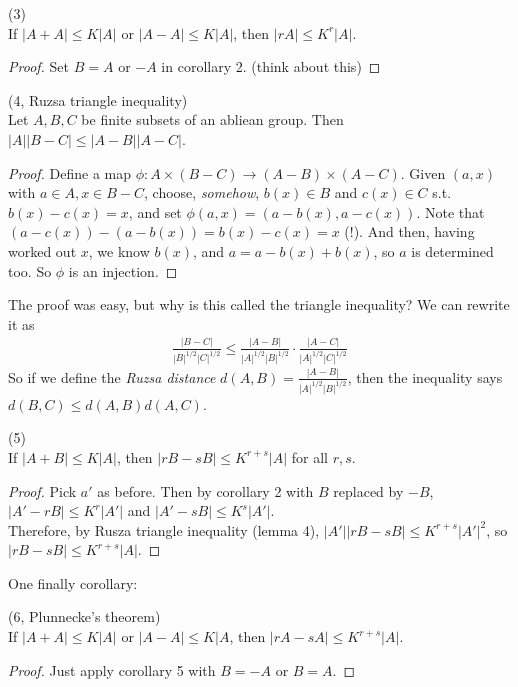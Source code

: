 \documentclass[a4paper]{article}
\begin{document}
\begin{coro} (3)\\
    If $|A+A| \leq K|A|$ or $|A-A| \leq K|A|$, then $|rA| \leq K^r|A|$.
    \begin{proof}
        Set $B=A$ or $-A$ in corollary 2. (think about this)
    \end{proof}
\end{coro}

\begin{lemma} (4, Ruzsa triangle inequality)\\
    Let $A,B,C$ be finite subsets of an abliean group. Then $|A||B-C| \leq |A-B||A-C|$.
    \begin{proof}
        Define a map $\phi: A\times(B-C) \to (A-B) \times (A-C)$. Given $(a,x)$ with $a\in A, x \in B-C$, choose, \emph{somehow}, $b(x) \in B$ and $c(x) \in C$ s.t. $b(x) - c(x) = x$, and set $\phi(a,x) = (a-b(x),a-c(x))$. Note that $(a-c(x)) - (a-b(x)) = b(x)-c(x) = x$ (!). And then, having worked out $x$, we know $b(x)$, and $a=a-b(x)+b(x)$, so $a$ is determined too. So $\phi$ is an injection.
    \end{proof}
\end{lemma}

The proof was easy, but why is this called the triangle inequality? We can rewrite it as 
\begin{equation*}
    \begin{aligned}
        \frac{|B-C|}{|B|^{1/2}|C|^{1/2}} \leq \frac{|A-B|}{|A|^{1/2}|B|^{1/2}} \cdot \frac{|A-C|}{|A|^{1/2}|C|^{1/2}}
    \end{aligned}
\end{equation*}
So if we define the \emph{Ruzsa distance} $d(A,B) = \frac{|A-B|}{|A|^{1/2}|B|^{1/2}}$, then the inequality says $d(B,C) \leq d(A,B) d(A,C)$.

\begin{coro} (5)\\
    If $|A+B| \leq K|A|$, then $|rB-sB| \leq K^{r+s}|A|$ for all $r,s$.
    \begin{proof}
        Pick $a'$ as before. Then by corollary 2 with $B$ replaced by $-B$, $|A'-rB| \leq K^r|A'|$ and $|A'-sB| \leq K^s|A'|$.\\
        Therefore, by Rusza triangle inequality (lemma 4), $|A'||rB-sB| \leq K^{r+s}|A'|^2$, so $|rB-sB| \leq K^{r+s} |A|$.
    \end{proof}
\end{coro}

One finally corollary:
\begin{coro} (6, Plunnecke's theorem)\\
    If $|A+A| \leq K|A|$ or $|A-A| \leq K|A$, then $|rA-sA| \leq K^{r+s} |A|$.
    \begin{proof}
        Just apply corollary 5 with $B=-A$ or $B=A$.
    \end{proof}
\end{coro}
\end{document}
